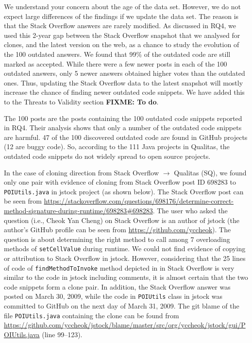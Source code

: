 \documentclass[a4paper,twoside,10pt]{reviewresponse}
\newcommand\FIXME[1]{{\color{red}\textbf{FIXME: #1}}}
\begin{document}
We understand your concern about the age of the data set. However, we do not expect large differences of the findings if we update the data set. The reason is that the Stack Overflow answers are rarely modified. As discussed in RQ4, we used this 2-year gap between the Stack Overflow snapshot that we analysed for clones, and the latest version on the web, as a chance to study the evolution of the 100 outdated answers. We found that 99\% of the outdated code are still marked as accepted. While there were a few newer posts in each of the 100 outdated answers, only 5 newer answers obtained higher votes than the outdated ones. Thus, updating the Stack Overflow data to the latest snapshot will mostly increase the chance of finding newer outdated code snippets.
We have added this to the Threats to Validity section \FIXME{To do}.

The 100 posts are the posts containing the 100 outdated code snippets reported in RQ4. Their analysis shows that only a number of the outdated code snippets are harmful. 47 of the 100 discovered outdated code are found in GitHub projects (12 are buggy code). So, according to the 111 Java projects in Qualitas, the outdated code snippets do not widely spread to open source projects.


In the case of cloning direction from Stack Overflow $\rightarrow$ Qualitas
(SQ), we found only one pair with evidence of cloning from Stack Overflow post
ID 698283 to {\small\texttt{POIUtils.java}} in \textsf{jstock} project (as shown below). 
The Stack Overflow post can be seen from \url{https://stackoverflow.com/questions/698176/determine-correct-method-signature-during-runtime/698283#698283}.
The user who asked the question (i.e., Cheok Yan Cheng) on Stack Overflow is an author of \textsf{jstock} (the author's GitHub profile can be seen from \url{https://github.com/yccheok}). The
question is about determining the right method to call among 7 overloading
methods of {\small\texttt{setCellValue}} during runtime. We could not find
evidence of copying or attribution to Stack Overflow in \textsf{jstock}.
However, considering that the 25 lines of code of
{\small\texttt{findMethodToInvoke}} method depicted in  in Stack Overflow is
very similar to the code in \textsf{jstock} including comments, it is almost
certain that the two code snippets form a clone pair. In addition, the Stack
Overflow answer was posted on March 30, 2009, while the code in
{\small\texttt{POIUtils}} class in \textsf{jstock} was committed to GitHub on
the next day of March 31, 2009. 
The git blame of the file \texttt{POIUtils.java} 
containing the clone can be found from \url{https://github.com/yccheok/jstock/blame/master/src/org/yccheok/jstock/gui/POIUtils.java} (line 99--123).
\end{document}
